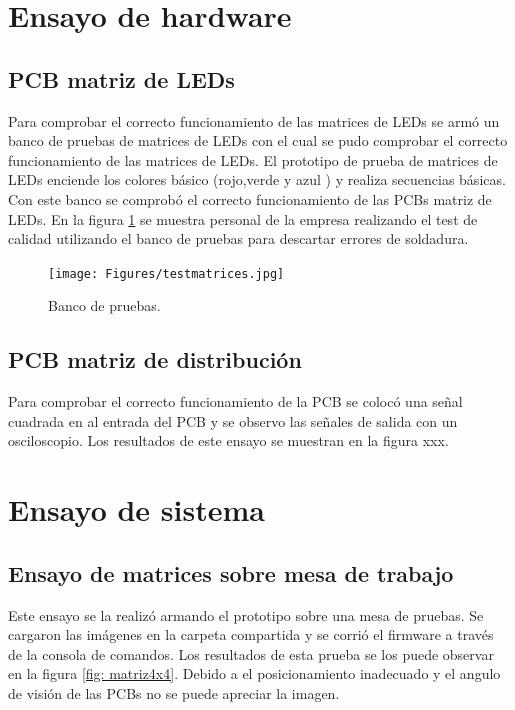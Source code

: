 \section{Ensayo de hardware}
\subsection{PCB matriz de LEDs}
Para comprobar el correcto funcionamiento de las matrices de LEDs se armó un banco de pruebas de matrices de LEDs con el cual se pudo comprobar el correcto funcionamiento de las matrices de LEDs. El prototipo de prueba de matrices de LEDs enciende los colores básico (rojo,verde y azul ) y realiza secuencias básicas. Con este banco se comprobó el correcto funcionamiento de las PCBs matriz de LEDs. En la figura \ref{fig: banco de pruebas} se muestra personal de la empresa realizando el  test de calidad utilizando el banco de pruebas para descartar errores de soldadura.

\begin{figure}[htpb]
	\centering
	\texttt{[image: Figures/testmatrices.jpg]} 
	\caption{Banco de pruebas.}
	\label{fig: banco de pruebas}
\end{figure}



\subsection{PCB matriz de distribución}
Para comprobar el correcto funcionamiento de la PCB se colocó una señal cuadrada en al entrada del PCB y se observo las señales de salida con un osciloscopio. Los resultados de este ensayo se muestran en la figura xxx.



\section{Ensayo de sistema}
\subsection{Ensayo de matrices sobre mesa de trabajo}
Este ensayo se la realizó armando el prototipo sobre una mesa de pruebas. Se cargaron las imágenes en la carpeta compartida y se corrió el firmware a través de la consola de comandos. Los resultados de esta prueba se los puede observar en la figura \ref{fig: matriz4x4}. Debido a el posicionamiento inadecuado y el angulo de visión de las PCBs no se puede apreciar la imagen.

